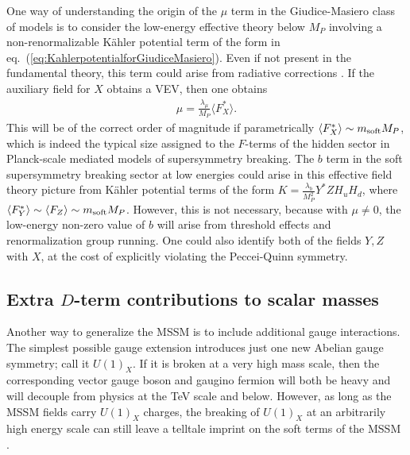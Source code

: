 \documentclass[11pt]{article}
\def\beq{\begin{eqnarray}}
\def\eeq{\end{eqnarray}}
\begin{document}
One way of understanding the origin of the $\mu$ term in the Giudice-Masiero
class of models is to consider the low-energy effective theory below $M_P$
involving a non-renormalizable K\"ahler potential term of the form in
eq.~(\ref{eq:KahlerpotentialforGiudiceMasiero}). Even if not present in
the fundamental theory, this term could arise from radiative corrections
\cite{HallLykkenWeinberg}. If
the auxiliary field for $X$ obtains a VEV, then one obtains \beq
\mu = \frac{\lambda_\mu}{M_P} \langle F_X^* \rangle .
\eeq
This will be of the correct order of magnitude if parametrically
$\langle F_X^* \rangle \sim m_{\rm soft} M_P$, which is indeed the typical
size
assigned to the $F$-terms of the hidden sector in Planck-scale mediated
models of supersymmetry breaking. The
$b$ term in the soft supersymmetry breaking sector at low energies could
arise in this effective field theory picture from K\"ahler potential terms of
the form $K = \frac{\lambda_b}{M_P^2} Y^* Z H_u H_d$, where $\langle F_Y^*
\rangle \sim \langle F_Z \rangle \sim m_{\rm soft} M_P$. 
However, this is not necessary, because with $\mu
\not= 0$, the low-energy non-zero value of $b$ will arise from
threshold effects and renormalization group running.
One
could also identify both of the fields $Y,Z$ with $X$, at the cost of explicitly violating
the Peccei-Quinn symmetry.

\subsection{Extra $D$-term contributions to scalar 
masses}\label{subsec:variations.Dterms}
\setcounter{equation}{0}

Another way to generalize the MSSM is to include additional gauge
interactions. The simplest possible gauge extension introduces just one
new Abelian gauge symmetry; call it $U(1)_X$. If it is broken at a very
high mass scale, then the corresponding vector gauge boson and gaugino
fermion will both be heavy and will decouple from physics at the TeV scale
and below. However, as long as the MSSM fields carry $U(1)_X$ charges, the
breaking of $U(1)_X$ at an arbitrarily high energy scale can still leave a
telltale imprint on the soft terms of the MSSM \cite{Dterms}. 
\end{document}
